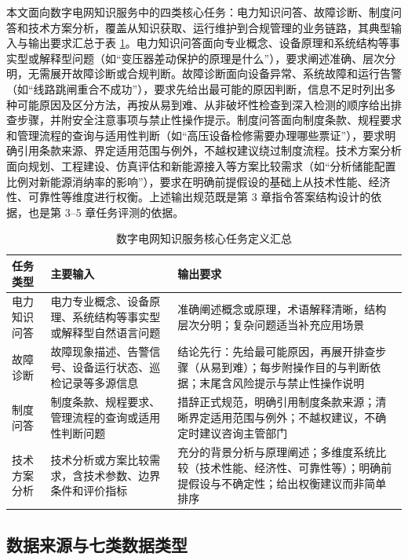 \documentclass[fontset=fandol,type=master,campus=shenzhen,etitleauto=true]{hithesisbook}
\begin{document}
本文面向数字电网知识服务中的四类核心任务：电力知识问答、故障诊断、制度问答和技术方案分析，覆盖从知识获取、运行维护到合规管理的业务链路，其典型输入与输出要求汇总于表 \ref{tab:task-def}。电力知识问答面向专业概念、设备原理和系统结构等事实型或解释型问题（如``变压器差动保护的原理是什么''），要求阐述准确、层次分明，无需展开故障诊断或合规判断。故障诊断面向设备异常、系统故障和运行告警（如``线路跳闸重合不成功''），要求先给出最可能的原因判断，信息不足时列出多种可能原因及区分方法，再按从易到难、从非破坏性检查到深入检测的顺序给出排查步骤，并附安全注意事项与禁止性操作提示。制度问答面向制度条款、规程要求和管理流程的查询与适用性判断（如``高压设备检修需要办理哪些票证''），要求明确引用条款来源、界定适用范围与例外，不越权建议绕过制度流程。技术方案分析面向规划、工程建设、仿真评估和新能源接入等方案比较需求（如``分析储能配置比例对新能源消纳率的影响''），要求在明确前提假设的基础上从技术性能、经济性、可靠性等维度进行权衡。上述输出规范既是第 3 章指令答案结构设计的依据，也是第 3--5 章任务评测的依据。

\begin{table}[htbp]
\centering
\caption{数字电网知识服务核心任务定义汇总}
\label{tab:task-def}
\small
\begin{tabular}{p{2.5cm}p{4.5cm}p{6.0cm}}
\toprule
\textbf{任务类型} & \textbf{主要输入} & \textbf{输出要求} \\
\midrule
电力知识问答 & 电力专业概念、设备原理、系统结构等事实型或解释型自然语言问题 & 准确阐述概念或原理，术语解释清晰，结构层次分明；复杂问题适当补充应用场景 \\
\addlinespace
故障诊断 & 故障现象描述、告警信号、设备运行状态、巡检记录等多源信息 & 结论先行：先给最可能原因，再展开排查步骤（从易到难）；每步附操作目的与判断依据；末尾含风险提示与禁止性操作说明 \\
\addlinespace
制度问答 & 制度条款、规程要求、管理流程的查询或适用性判断问题 & 措辞正式规范，明确引用制度条款来源；清晰界定适用范围与例外；不越权建议，不确定时建议咨询主管部门 \\
\addlinespace
技术方案分析 & 技术分析或方案比较需求，含技术参数、边界条件和评价指标 & 充分的背景分析与原理阐述；多维度系统比较（技术性能、经济性、可靠性等）；明确前提假设与不确定性；给出权衡建议而非简单排序 \\
\bottomrule
\end{tabular}
\end{table}

\subsection{数据来源与七类数据类型}\label{ux6570ux636eux6765ux6e90ux4e0eux4e03ux7c7bux6570ux636eux7c7bux578b}
\end{document}
